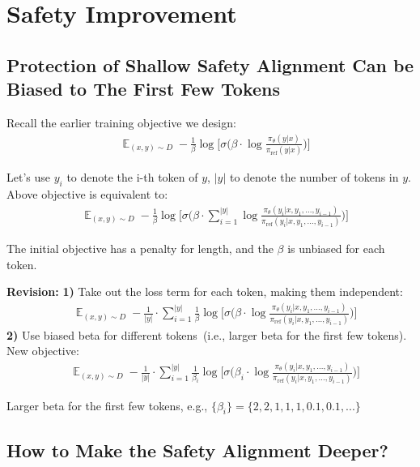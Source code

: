 \section{Safety Improvement}
\label{sec:safety_imporvement}

\subsection{Protection of Shallow Safety Alignment Can be Biased to The First Few Tokens}

Recall the earlier training objective we design:
\begin{align*}
    & \mathop{\mathbb E}_{(x,y)\sim D} -\frac{1}{\beta}\log\Bigg[\sigma \bigg(\beta \cdot \log \frac{\pi_{\theta}(y|x)}{\pi_{\text{ref}}(y|x)} \bigg) \Bigg]
\end{align*}

Let's use $y_i$ to denote the i-th token of $y$,  $|y|$ to denote the number of tokens in $y$. Above objective is equivalent to:
\begin{align*}
    & \mathop{\mathbb E}_{(x,y)\sim D} -\frac{1}{\beta}\log\Bigg[\sigma \bigg( \beta \cdot \sum_{i=1}^{|y|} \log \frac{\pi_{\theta}(y_i|x, y_1,...,y_{i-1})}{\pi_{\text{ref}}(y_i|x, y_1,...,y_{i-1})} \bigg) \Bigg]
\end{align*}

The initial objective has a penalty for length, and the $\beta$ is unbiased for each token.

\textbf{Revision:} \textbf{1)} Take out the loss term for each token, making them independent:
\begin{align*}
    & \mathop{\mathbb E}_{(x,y)\sim D} - \frac{1}{|y|} \cdot \sum_{i=1}^{|y|} \frac{1}{\beta} \log\Bigg[\sigma \bigg( \beta \cdot  \log \frac{\pi_{\theta}(y_i|x, y_1,...,y_{i-1})}{\pi_{\text{ref}}(y_i|x, y_1,...,y_{i-1})} \bigg) \Bigg]
\end{align*}
\textbf{2)} Use biased beta for different tokens~(i.e., larger beta for the first few tokens). New objective:
\begin{align*}
    & \mathop{\mathbb E}_{(x,y)\sim D} - \frac{1}{|y|} \cdot \sum_{i=1}^{|y|} \frac{1}{\beta_i} \log\Bigg[\sigma \bigg( \beta_i \cdot  \log \frac{\pi_{\theta}(y_i|x, y_1,...,y_{i-1})}{\pi_{\text{ref}}(y_i|x, y_1,...,y_{i-1})} \bigg) \Bigg]
\end{align*}

Larger beta for the first few tokens, e.g., $\{\beta_i\} = \{2, 2, 1, 1, 1, 0.1, 0.1, ...\}$

\subsection{How to Make the Safety Alignment Deeper?}